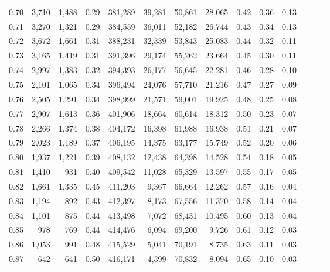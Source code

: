 \begin{tabular}{rrrrrrrrrrrrrr}
0.70 &   3,710 &  1,488 &  0.29 &  381,289 &   39,281 &  50,861 &  28,065 &  0.42 &  0.36 &      0.13 \\
0.71 &   3,270 &  1,321 &  0.29 &  384,559 &   36,011 &  52,182 &  26,744 &  0.43 &  0.34 &      0.13 \\
0.72 &   3,672 &  1,661 &  0.31 &  388,231 &   32,339 &  53,843 &  25,083 &  0.44 &  0.32 &      0.11 \\
0.73 &   3,165 &  1,419 &  0.31 &  391,396 &   29,174 &  55,262 &  23,664 &  0.45 &  0.30 &      0.11 \\
0.74 &   2,997 &  1,383 &  0.32 &  394,393 &   26,177 &  56,645 &  22,281 &  0.46 &  0.28 &      0.10 \\
0.75 &   2,101 &  1,065 &  0.34 &  396,494 &   24,076 &  57,710 &  21,216 &  0.47 &  0.27 &      0.09 \\
0.76 &   2,505 &  1,291 &  0.34 &  398,999 &   21,571 &  59,001 &  19,925 &  0.48 &  0.25 &      0.08 \\
0.77 &   2,907 &  1,613 &  0.36 &  401,906 &   18,664 &  60,614 &  18,312 &  0.50 &  0.23 &      0.07 \\
0.78 &   2,266 &  1,374 &  0.38 &  404,172 &   16,398 &  61,988 &  16,938 &  0.51 &  0.21 &      0.07 \\
0.79 &   2,023 &  1,189 &  0.37 &  406,195 &   14,375 &  63,177 &  15,749 &  0.52 &  0.20 &      0.06 \\
0.80 &   1,937 &  1,221 &  0.39 &  408,132 &   12,438 &  64,398 &  14,528 &  0.54 &  0.18 &      0.05 \\
0.81 &   1,410 &    931 &  0.40 &  409,542 &   11,028 &  65,329 &  13,597 &  0.55 &  0.17 &      0.05 \\
0.82 &   1,661 &  1,335 &  0.45 &  411,203 &    9,367 &  66,664 &  12,262 &  0.57 &  0.16 &      0.04 \\
0.83 &   1,194 &    892 &  0.43 &  412,397 &    8,173 &  67,556 &  11,370 &  0.58 &  0.14 &      0.04 \\
0.84 &   1,101 &    875 &  0.44 &  413,498 &    7,072 &  68,431 &  10,495 &  0.60 &  0.13 &      0.04 \\
0.85 &     978 &    769 &  0.44 &  414,476 &    6,094 &  69,200 &   9,726 &  0.61 &  0.12 &      0.03 \\
0.86 &   1,053 &    991 &  0.48 &  415,529 &    5,041 &  70,191 &   8,735 &  0.63 &  0.11 &      0.03 \\
0.87 &     642 &    641 &  0.50 &  416,171 &    4,399 &  70,832 &   8,094 &  0.65 &  0.10 &      0.03 \\

\end{tabular}
